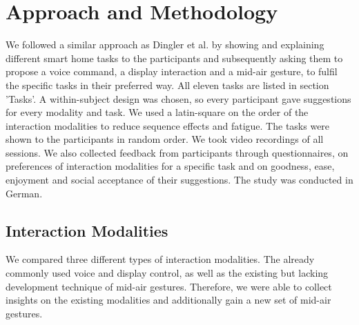 \documentclass[sigchi]{acmart}
\begin{document}
	
	\section{Approach and Methodology}
	We followed a similar approach as Dingler et al. \cite{Dingler.2018} by showing and explaining different smart home tasks to the participants and subsequently asking them to propose a voice command, a display interaction and a mid-air gesture, to fulfil the specific tasks in their preferred way. All eleven tasks are listed in section 'Tasks'. A within-subject design was chosen, so every participant gave suggestions for every modality and task. We used a latin-square on the order of the interaction modalities to reduce sequence effects \cite{.2017} and fatigue. The tasks were shown to the participants in  random order. We took video recordings of all sessions. We also collected feedback from participants through questionnaires, on preferences of interaction modalities for a specific task and on goodness, ease, enjoyment and social acceptance of their suggestions. The study was conducted in German.
	
	\subsection{Interaction Modalities}
	We compared three different types of interaction modalities. The already commonly used voice and display control, as well as the existing but lacking development technique of mid-air gestures. Therefore, we were able to collect insights on the existing modalities and additionally gain a new set of mid-air gestures.
	
\end{document}

